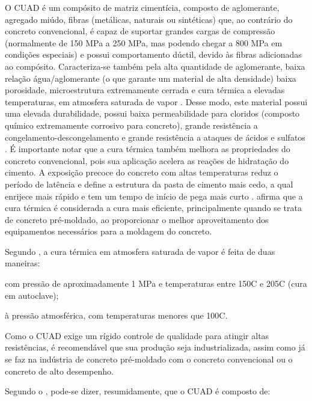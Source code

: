 O CUAD é um compósito de matriz cimentícia, composto de aglomerante, agregado miúdo, fibras (metálicas, naturais ou sintéticas) que, ao contrário do concreto convencional, é capaz de suportar grandes cargas de compressão (normalmente de 150 MPa a 250 MPa, mas podendo chegar a 800 MPa em condições especiais) e possui comportamento dúctil, devido às fibras adicionadas ao compósito. Caracteriza-se também pela alta quantidade de aglomerante, baixa relação água/aglomerante (o que garante um material de alta densidade) baixa porosidade, microestrutura extremamente cerrada e cura térmica a elevadas temperaturas, em atmosfera saturada de vapor \cite{AFGC}. Desse modo, este material possui uma elevada durabilidade, possui baixa permeabilidade para cloridos (composto químico extremamente corrosivo para concreto), grande resistência a congelamento-descongelamento e grande resistência a ataques de ácidos e sulfatos \cite[p.~7-11]{Resplendino}. É importante notar que a cura térmica também melhora as propriedades do concreto convencional, pois sua aplicação acelera as reações de hidratação do cimento. A exposição precoce do concreto com altas temperaturas reduz o período de latência e define a estrutura da pasta de cimento mais cedo, a qual enrijece mais rápido e tem um tempo de início de pega mais curto .  afirma que a cura térmica é considerada a cura mais eficiente, principalmente quando se trata de concreto pré-moldado, ao proporcionar o melhor aproveitamento dos equipamentos necessários para a moldagem do concreto.

Segundo , a cura térmica em atmosfera saturada de vapor é feita de duas maneiras:

\begin{alineas}[label=\textbullet]
  \item com pressão de aproximadamente 1 MPa e temperaturas entre 150\textsuperscript{\degree}C e 205\textsuperscript{\degree}C (cura em autoclave);
  \item à pressão atmosférica, com temperaturas menores que 100\textsuperscript{\degree}C.
\end{alineas}

Como o CUAD exige um rígido controle de qualidade para atingir altas resistências, é recomendável que sua produção seja industrializada, assim como já se faz na indústria de concreto pré-moldado com o concreto convencional ou o concreto de alto desempenho.

Segundo o , pode-se dizer, resumidamente, que o CUAD é composto de: %

